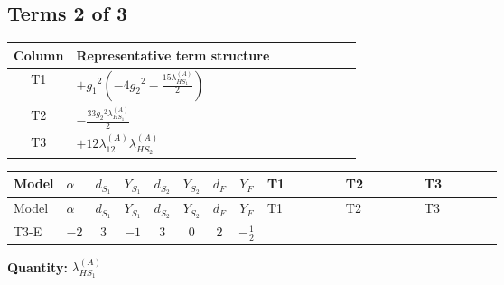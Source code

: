 \documentclass[8pt]{article}
\begin{document}
\begin{landscape}
\subsection*{Terms 2 of 3}
\begin{center}
\begin{tabular}{@{}c >{\raggedright\arraybackslash}p{0.82\linewidth}@{}}
\toprule
Column & Representative term structure \\
\midrule
T1 & \(\displaystyle +{g_1}^2 \left(-4 {g_2}^2-\frac{15 {\lambda_{HS_1}^{(A)}}}{2}\right)\) \\
\midrule
T2 & \(\displaystyle -\frac{33 {g_2}^2 {\lambda_{HS_1}^{(A)}}}{2}\) \\
\midrule
T3 & \(\displaystyle +12 {\lambda_{12}^{(A)}} {\lambda_{HS_2}^{(A)}}\) \\
\midrule
\bottomrule
\end{tabular}
\end{center}
\smallskip
\tiny
\begin{longtable}{@{}llcccccc >{\raggedright\arraybackslash}p{0.21\linewidth} >{\raggedright\arraybackslash}p{0.21\linewidth} >{\raggedright\arraybackslash}p{0.21\linewidth}@{}}
\toprule
Model & $\alpha$ & $d_{S_1}$ & $Y_{S_1}$ & $d_{S_2}$ & $Y_{S_2}$ & $d_F$ & $Y_F$ & T1 & T2 & T3 \\
\midrule
\endfirsthead
\toprule
Model & $\alpha$ & $d_{S_1}$ & $Y_{S_1}$ & $d_{S_2}$ & $Y_{S_2}$ & $d_F$ & $Y_F$ & T1 & T2 & T3 \\
\midrule
\endhead
T3-E & $-2$ & $3$ & $-1$ & $3$ & $0$ & $2$ & $-\frac{1}{2}$ & \scriptsize\adjustbox{max width=\linewidth}{$\begin{gathered} +{g_1}^2 \left(-4 {g_2}^2-\frac{15 {\lambda_{HS_1}^{(A)}}}{2}\right)\end{gathered}$} & \scriptsize\adjustbox{max width=\linewidth}{$\begin{gathered} -\frac{33 {g_2}^2 {\lambda_{HS_1}^{(A)}}}{2}\end{gathered}$} & \scriptsize\adjustbox{max width=\linewidth}{$\begin{gathered} +12 {\lambda_{12}^{(A)}} {\lambda_{HS_2}^{(A)}}\end{gathered}$} \\
\midrule
\bottomrule
\end{longtable}
\clearpage
\noindent\textbf{Quantity: }$\lambda_{HS_1}^{(A)}$\par\smallskip

\end{landscape}
\end{document}
